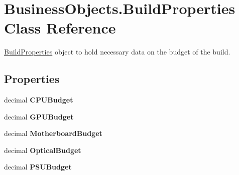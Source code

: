 \hypertarget{class_business_objects_1_1_build_properties}{}\section{Business\+Objects.\+Build\+Properties Class Reference}
\label{class_business_objects_1_1_build_properties}


\hyperlink{class_business_objects_1_1_build_properties}{Build\+Properties} object to hold necessary data on the budget of the build.  


\subsection*{Properties}
\begin{DoxyCompactItemize}
\item 
decimal {\bfseries C\+P\+U\+Budget}\hypertarget{class_business_objects_1_1_build_properties_ad47af7204e41617b511c28fe51bb2768}{}\label{class_business_objects_1_1_build_properties_ad47af7204e41617b511c28fe51bb2768}

\item 
decimal {\bfseries G\+P\+U\+Budget}\hypertarget{class_business_objects_1_1_build_properties_ae0f7d3ad79d4d78b73dba502a0f82147}{}\label{class_business_objects_1_1_build_properties_ae0f7d3ad79d4d78b73dba502a0f82147}

\item 
decimal {\bfseries Motherboard\+Budget}\hypertarget{class_business_objects_1_1_build_properties_a38e2be70d3a2a5cddb453c94132dbeaf}{}\label{class_business_objects_1_1_build_properties_a38e2be70d3a2a5cddb453c94132dbeaf}

\item 
decimal {\bfseries Optical\+Budget}\hypertarget{class_business_objects_1_1_build_properties_a69dd67f21573074f826cafc40ecc5bb6}{}\label{class_business_objects_1_1_build_properties_a69dd67f21573074f826cafc40ecc5bb6}

\item 
decimal {\bfseries P\+S\+U\+Budget}\hypertarget{class_business_objects_1_1_build_properties_abe6c1bb5085fe3d404fadfe9ab48b5fe}{}\label{class_business_objects_1_1_build_properties_abe6c1bb5085fe3d404fadfe9ab48b5fe}


\end{DoxyCompactItemize}
